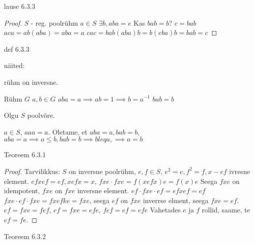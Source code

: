 \documentclass[12pt]{report}
\numberwithin{equation}{section}
\theoremstyle{definition}
\theoremstyle{plain}
\begin{document}
lause 6.3.3

\begin{proof}
$S$ -  reg. poolr\"uhm
$a \in S$
$\exists b, aba = e$
Kas $bab = b$?
$c = bab$
$aca = ab(aba) = aba = a$
$cac = bab(aba)b = b(eba)b = bab = c$
\end{proof}

def 6.3.3

näited:

r\"uhm on inversne. 

R\"uhm $G$
$a,b \in G$
$aba = a \implies ab = 1 \implies b = a ^{-1}$
$bab = b$

Olgu $S$ poolvõre.

$a \in S$, $aaa = a$.
Oletame, et $aba = a, bab = b$, $aba = a \implies a \leq b, bab =b \implies b leq a, \implies a = b$

Teoreem 6.3.1

\begin{proof}
Tarvilikkus: $S$ on inversne poolr\"uhm, $e,f \in S$, $e^2 = e, f^2 = f, x -ef$ ivresne element.
$efxef = ef, xefx = x$,
$fxe \cdot fxe = f(xefx)e = f(x)e$
Seega $fxe$ on idempotent, $fxe$ on $fxe$ inversne element.
$ef \cdot fxe \cdot ef = efxef = ef$
$fxe \cdot ef \cdot fxe = fxefke = fxe$, seega $ef$ on $fxe$ inverrse elment, seega $fxe = ef$. 
$ef = fxe = fef$, $ef = fxe = efe$, $fef=ef=efe$
Vahetades $e$ ja $f$ rollid, saame, te $ef = fe$.
\end{proof}

Teoreem 6.3.2
\end{document}
